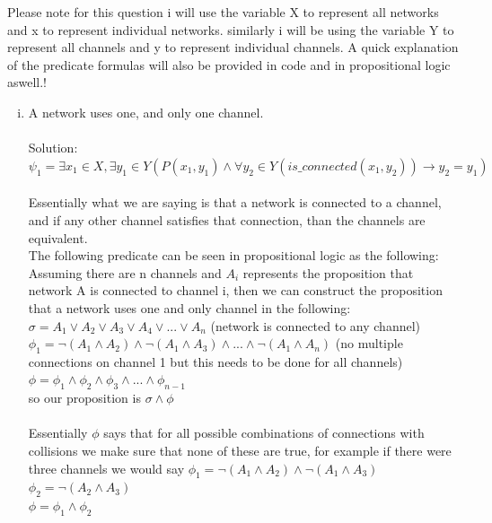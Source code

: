 \documentclass{article}
\newcommand*\moveToRight[1]{\hspace*{0em plus 1fill}\makebox{(#1)}}
\begin{document}
\begin{enumerate}[(a)]
        Please note for this question i will use the variable X to represent all networks and x to represent individual networks. similarly i will be using the variable Y to represent all channels and y to represent individual channels. A quick explanation of the predicate formulas will also be provided in code and in propositional logic aswell.!
        \begin{enumerate}[(i)]
            \item A network uses one, and only one channel. \moveToRight{2 marks}\\\\
            Solution: \\
            $\psi_1 = \exists x_1 \in X, \exists y_1 \in Y (P(x_1,y_1) \land \forall y_2 \in Y (is\_connected(x_1, y_2)) \to y_2 = y_1)$\\\\
            Essentially what we are saying is that a network is connected to a channel, and  if any other channel satisfies that connection, than the channels are equivalent.\\
            The following predicate can be seen in propositional logic as the following:\\ Assuming there are n channels and $A_i$ represents the proposition that network A is connected to channel i, then we can construct the proposition that a network uses one and only channel in the following:\\
            $\sigma = A_1 \lor A_2 \lor A_3 \lor A_4 \lor ... \lor A_n$ (network is connected to any channel)\\ 
            $\phi_1 = \neg(A_1 \land A_2) \land \neg(A_1 \land A_3) \land ... \land \neg(A_1 \land A_n)$ (no multiple connections on channel 1 but this needs to be done for all channels) 
            $\phi = \phi_1 \land \phi_2 \land \phi_3 \land ... \land \phi_{n-1}$\\
            so our proposition is $\sigma \land \phi$\\\\
            Essentially $\phi$ says that for all possible combinations of connections with collisions we make sure that none of these are true, for example if there were three channels we would say 
            $\phi_1 = \neg(A_1 \land A_2) \land \neg(A_1 \land A_3)$\\
            $\phi_2 = \neg(A_2 \land A_3)$ \moveToRight{note $A_2 \land A_1$ is captured in $\phi_1$}\\
            $\phi = \phi_1 \land \phi_2$\\

\end{enumerate}
\end{enumerate}
\end{document}
